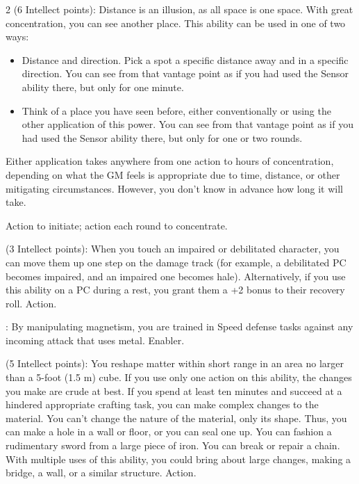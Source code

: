 \begin{multicols}{2}
 (6 Intellect points): Distance is an illusion, as all space is one space. With great concentration, you can see another place. This ability can be used in one of two ways: 

\begin{itemize} 
\item Distance and direction. Pick a spot a specific distance away and in a specific direction. You can see from that vantage point as if you had used the Sensor ability there, but only for one minute. 

\item Think of a place you have seen before, either conventionally or using the other application of this power. You can see from that vantage point as if you had used the Sensor ability there, but only for one or two rounds.
\end{itemize}

Either application takes anywhere from one action to hours of concentration, depending on what the GM feels is appropriate due to time, distance, or other mitigating circumstances. However, you don’t know in advance how long it will take. 

Action to initiate; action each round to concentrate. 
 
 (3 Intellect points): When you touch an impaired or debilitated character, you can move them up one step on the damage track (for example, a debilitated PC becomes impaired, and an impaired one becomes hale). Alternatively, if you use this ability on a PC during a rest, you grant them a +2 bonus to their recovery roll. Action. 
 
: By manipulating magnetism, you are trained in Speed defense tasks against any incoming attack that uses metal. Enabler. 
 
 (5 Intellect points): You reshape matter within short range in an area no larger than a 5-foot (1.5 m) cube. If you use only one action on this ability, the changes you make are crude at best. If you spend at least ten minutes and succeed at a hindered appropriate crafting task, you can make complex changes to the material. You can’t change the nature of the material, only its shape. Thus, you can make a hole in a wall or floor, or you can seal one up. You can fashion a rudimentary sword from a large piece of iron. You can break or repair a chain. With multiple uses of this ability, you could bring about large changes, making a bridge, a wall, or a similar structure. Action.
 

\end{multicols}
